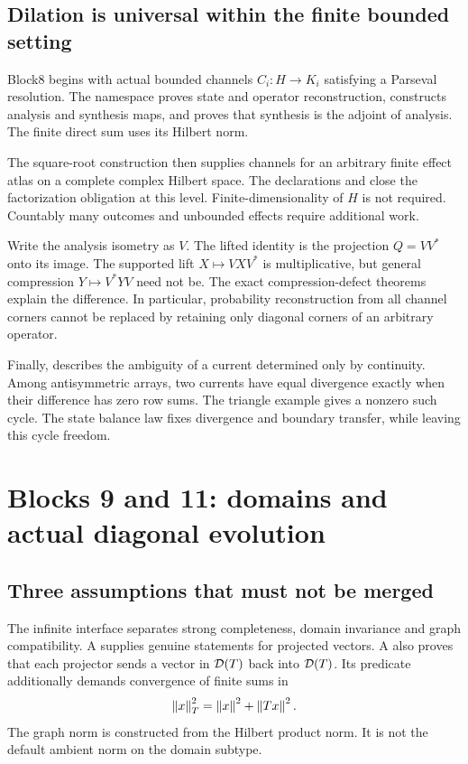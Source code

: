 \subsection{Dilation is universal within the finite bounded setting}

Block8 begins with actual bounded channels \(C_i:H\to K_i\) satisfying a Parseval resolution. The namespace  proves state and operator reconstruction, constructs analysis and synthesis maps, and proves that synthesis is the adjoint of analysis. The finite direct sum uses its Hilbert norm.

The square-root construction then supplies channels for an arbitrary finite effect atlas on a complete complex Hilbert space. The declarations  and  close the factorization obligation at this level. Finite-dimensionality of \(H\) is not required. Countably many outcomes and unbounded effects require additional work.

Write the analysis isometry as \(V\). The lifted identity is the projection \(Q=VV^*\) onto its image. The supported lift \(X\mapsto VXV^*\) is multiplicative, but general compression \(Y\mapsto V^*YV\) need not be. The exact compression-defect theorems explain the difference. In particular, probability reconstruction from all channel corners cannot be replaced by retaining only diagonal corners of an arbitrary operator.

Finally,  describes the ambiguity of a current determined only by continuity. Among antisymmetric arrays, two currents have equal divergence exactly when their difference has zero row sums. The triangle example gives a nonzero such cycle. The state balance law fixes divergence and boundary transfer, while leaving this cycle freedom.

\section{Blocks 9 and 11: domains and actual diagonal evolution}

\subsection{Three assumptions that must not be merged}

The infinite interface separates strong completeness, domain invariance and graph compatibility. A  supplies genuine  statements for projected vectors. A  also proves that each projector sends a vector in \(\mathcal D(T)\) back into \(\mathcal D(T)\). Its  predicate additionally demands convergence of finite sums in
\[
 \left\lVert x\right\rVert_{T}^{2}=\left\lVert x\right\rVert^{2}+\left\lVert Tx\right\rVert^{2}.
\]
The graph norm is constructed from the Hilbert product norm. It is not the default ambient norm on the domain subtype.

